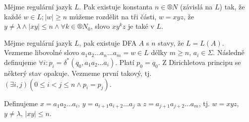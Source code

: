 \documentclass[12pt]{article}                   %
\begin{document}
    \begin{veta}
        Mějme regulární jazyk $L$. Pak existuje konstanta $n \in ®N$ (závislá na $L$) tak, že každé $w \in L; |w| ≥ n$ můžeme rozdělit na tři části, $w = xyz$, že $y ≠ \lambda \land |xy| ≤ n \land \forall k \in ®N_0$, slovo $xy^kz$ je také v $L$.

        \begin{dukazin}
            Mějme regulární jazyk $L$, pak existuje DFA $A$ s $n$ stavy, že $L = L(A)$. Vezmeme libovolné slovo $a_1a_2…a_n…a_m = w \in L$ délky $m ≥ n$, $a_i \in \Sigma$. Následně definujeme $\forall i: p_i = \delta^*(q_0, a_1a_2…a_i)$. Platí $p_0 = q_0$. Z Dirichletova principu se některý stav opakuje. Vezmeme první takový, tj. $(\exists i, j)(0 ≤ i < j ≤ n \land p_i = p_j)$.

            Definujeme $x = a_1a_2…a_i$, $y = a_{i+1}a_{i+2}…a_j$ a $z = a_{j+1}a_{j+2}…a_m$, tj. $w = xyz$, $y ≠ \lambda$, $|xy| ≤ n$.
        \end{dukazin}
    \end{veta}
\end{document}
